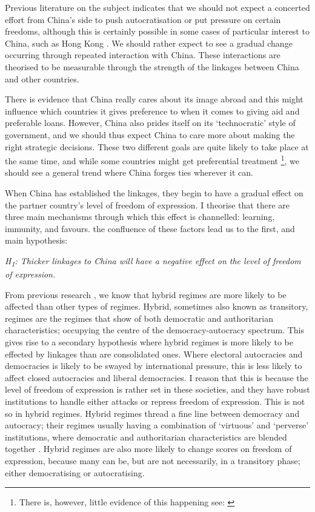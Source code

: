 Previous literature on the subject indicates that we should not expect a concerted effort from China's side to push autocratisation or put pressure on certain freedoms, although this is certainly possible in some cases of particular interest to China, such as Hong Kong \citep{chen_democracy_2015}. We should rather expect to see a gradual change occurring through repeated interaction with China. These interactions are theorised to be measurable through the strength of the linkages between China and other countries.

There is evidence that China really cares about its image abroad and this might influence which countries it gives preference to when it comes to giving aid and preferable loans. However, China also prides itself on its `technocratic' style of government, and we should thus expect China to care more about making the right strategic decisions. These two different goals are quite likely to take place at the same time, and while some countries might get preferential treatment \footnote{There is, however, little evidence of this happening see: \citet{brand_authoritarian_2015}}, we should see a general trend where China forges ties wherever it can.

When China has established the linkages, they begin to have a gradual effect on the partner country's level of freedom of expression. I theorise that there are three main mechanisms through which this effect is channelled: learning, immunity, and favours. the confluence of these factors lead us to the first, and main hypothesis:
\begin{displayquote}
    \textit{H\textsubscript{1}: Thicker linkages to China will have a negative effect on the level of freedom of expression.}  
\end{displayquote}

From previous research \citep{toettoe_foreign_2023}, we know that hybrid regimes are more likely to be affected than other types of regimes. Hybrid, sometimes also known as transitory, regimes are the regimes that show of both democratic and authoritarian characteristics; occupying the centre of the democracy-autocracy spectrum. This gives rise to a secondary hypothesis where hybrid regimes is more likely to be effected by linkages than are consolidated ones. Where electoral autocracies and democracies is likely to be swayed by international pressure, this is less likely to affect closed autocracies and liberal democracies. I reason that this is because the level of freedom of expression is rather set in these societies, and they have robust institutions to handle either attacks or repress freedom of expression. This is not so in hybrid regimes. Hybrid regimes thread a fine line between democracy and autocracy; their regimes usually having a combination of `virtuous' and `perverse' institutions, where democratic and authoritarian characteristics are blended together \citep{valenzuela_democratic_1990}. Hybrid regimes are also more likely to change scores on freedom of expression, because many can be, but are not necessarily, in a transitory phase; either democratising or autocratising.

